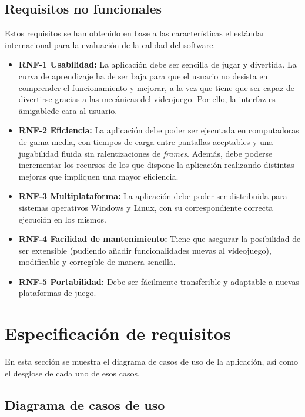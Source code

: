 \subsection{Requisitos no funcionales}

Estos requisitos se han obtenido en base a las características el estándar internacional para la evaluación de la calidad del software.

\begin{itemize}
\tightlist
\item 
	\textbf{RNF-1 Usabilidad:} La aplicación debe ser sencilla de jugar y divertida. La curva de aprendizaje ha de ser baja para que el usuario no desista en comprender el funcionamiento y mejorar, a la vez que tiene que ser capaz de divertirse gracias a las mecánicas del videojuego. Por ello, la interfaz es \"amigable\" de cara al usuario.

\item 
	\textbf{RNF-2 Eficiencia:} La aplicación debe poder ser ejecutada en computadoras de gama media, con tiempos de carga entre pantallas aceptables y una jugabilidad fluida sin ralentizaciones de \textit{frames}. Además, debe poderse incrementar los recursos de los que dispone la aplicación realizando distintas mejoras que impliquen una mayor eficiencia.
	
\item 
	\textbf{RNF-3 Multiplataforma:} La aplicación debe poder ser distribuida para sistemas operativos Windows y Linux, con su correspondiente correcta ejecución en los mismos. 
	
\item 
	\textbf{RNF-4 Facilidad de mantenimiento:} Tiene que asegurar la posibilidad de ser extensible (pudiendo añadir funcionalidades nuevas al videojuego), modificable y corregible de manera sencilla.

\item 
	\textbf{RNF-5 Portabilidad:} Debe ser fácilmente transferible y adaptable a nuevas plataformas de juego.

\end{itemize}
\section{Especificación de requisitos}

En esta sección se muestra el diagrama de casos de uso de la aplicación, así como el desglose de cada uno de esos casos.

\subsection{Diagrama de casos de uso}

